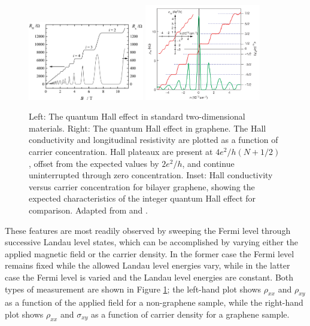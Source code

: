 \documentclass[edeposit,fullpage,draftthesis]{uiucthesis2009}
\begin{document}
        \begin{figure}
        \centering
        \includegraphics[width=0.45\textwidth]{images/background/integerQHE.jpg}
        \includegraphics[width=0.45\textwidth]{images/background/QHEinG.png}
        \caption[The quantum Hall effect]{
        Left: The quantum Hall effect in standard two-dimensional materials. 
        Right: The quantum Hall effect in graphene. The Hall conductivity and longitudinal resistivity are 
        plotted as a function of carrier concentration. Hall plateaux are present at $4 e^2 / h (N + 1/2)$, 
        offset from the expected values by $2 e^2 / h$, and continue uninterrupted through zero concentration. 
        Inset: Hall conductivity versus carrier concentration for bilayer graphene, showing the expected 
        characteristics of the integer quantum Hall effect for comparison. Adapted from 
        \cite{schurr2004width} and \cite{Novoselov2005}.}
        \label{fig:QHEinG}
        \end{figure}
      
        These features are most readily observed by sweeping the Fermi level through successive Landau
        level states, which can be accomplished by varying either the applied magnetic field
        or the carrier density. In the former case the Fermi level remains fixed while the allowed Landau level energies
        vary, while in the latter case the Fermi level is varied and the Landau level energies are constant.
        Both types of measurement are shown in Figure \ref{fig:QHEinG}; the left-hand plot shows $\rho_{xx}$ 
        and $\rho_{xy}$ as a function of the applied field for a non-graphene sample, while the right-hand plot
        shows $\rho_{xx}$ and $\sigma_{xy}$ as a function of carrier density for a graphene sample.
        
\end{document}
